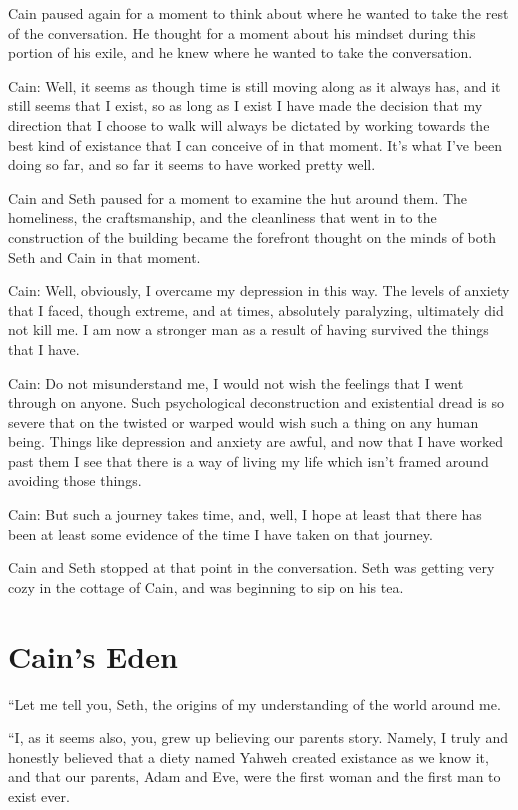 \documentclass[12pt,twoside,titlepage]{report}
\begin{document}
Cain paused again for a moment to think about where he wanted to take
the rest of the conversation. He thought for a moment about his mindset
during this portion of his exile, and he knew where he wanted to take
the conversation.

Cain: Well, it seems as though time is still moving along as it always
has, and it still seems that I exist, so as long as I exist I have made
the decision that my direction that I choose to walk will always be
dictated by working towards the best kind of existance that I can
conceive of in that moment. It's what I've been doing so far, and so far
it seems to have worked pretty well.

Cain and Seth paused for a moment to examine the hut around them. The
homeliness, the craftsmanship, and the cleanliness that went in to the
construction of the building became the forefront thought on the minds
of both Seth and Cain in that moment.

Cain: Well, obviously, I overcame my depression in this way. The levels
of anxiety that I faced, though extreme, and at times, absolutely
paralyzing, ultimately did not kill me. I am now a stronger man as a
result of having survived the things that I have.

Cain: Do not misunderstand me, I would not wish the feelings that I went
through on anyone. Such psychological deconstruction and existential
dread is so severe that on the twisted or warped would wish such a thing
on any human being. Things like depression and anxiety are awful, and
now that I have worked past them I see that there is a way of living my
life which isn't framed around avoiding those things.

Cain: But such a journey takes time, and, well, I hope at least that
there has been at least some evidence of the time I have taken on that
journey.

Cain and Seth stopped at that point in the conversation. Seth was
getting very cozy in the cottage of Cain, and was beginning to sip on
his tea.

\hypertarget{cains-eden}{%
\chapter{Cain's Eden}\label{cains-eden}}

``Let me tell you, Seth, the origins of my understanding of the world
around me.

``I, as it seems also, you, grew up believing our parents story. Namely,
I truly and honestly believed that a diety named Yahweh created
existance as we know it, and that our parents, Adam and Eve, were the
first woman and the first man to exist ever.
\end{document}
